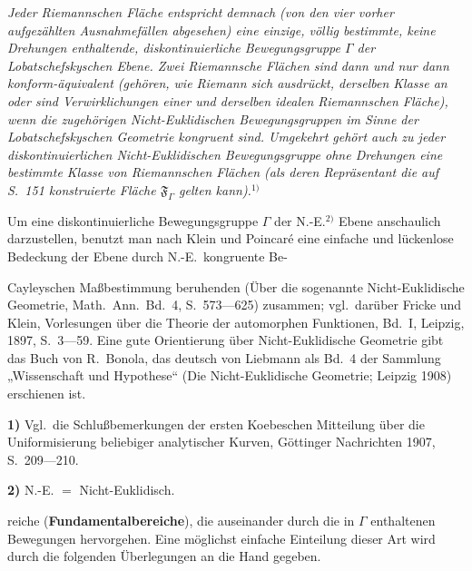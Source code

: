 \documentclass{article}
\begin{document}
\emph{Jeder Riemannschen Fläche entspricht demnach (von den vier vorher aufgezählten Ausnahmefällen abgesehen) eine einzige, völlig bestimmte, keine Drehungen enthaltende, diskontinuierliche Bewegungsgruppe $\varGamma$ der Lobatschefskyschen Ebene. Zwei Riemannsche Flächen sind dann und nur dann konform-äquivalent (gehören, wie Riemann sich ausdrückt, derselben Klasse an oder sind Verwirklichungen einer und derselben idealen Riemannschen Fläche), wenn die zugehörigen Nicht-Euklidischen Bewegungsgruppen im Sinne der Lobatschefskyschen Geometrie kongruent sind. Umgekehrt gehört auch zu jeder diskontinuierlichen Nicht-Euklidischen Bewegungsgruppe ohne Drehungen eine bestimmte Klasse von Riemannschen Flächen (als deren Repräsentant die auf S.~151 konstruierte Fläche $\mathfrak{F}_\varGamma$ gelten kann).}${}^{1)}$

Um eine diskontinuierliche Bewegungsgruppe $\varGamma$ der N.-E.${}^{2)}$ Ebene anschaulich darzustellen, benutzt man nach Klein und Poincaré eine einfache und lückenlose Bedeckung der Ebene durch N.-E.\ kongruente Be-

Cayleyschen Maßbestimmung beruhenden (Über die sogenannte Nicht-Euklidische Geometrie, Math.\ Ann.\ Bd.~4, S.~573---625) zusammen; vgl.\ darüber Fricke und Klein, Vorlesungen über die Theorie der automorphen Funktionen, Bd.~I, Leipzig, 1897, S.~3---59. Eine gute Orientierung über Nicht-Euklidische Geometrie gibt das Buch von R.~Bonola, das deutsch von Liebmann als Bd.~4 der Sammlung „Wissenschaft und Hypothese“ (Die Nicht-Euklidische Geometrie; Leipzig 1908) erschienen ist.

\textbf{1)} Vgl.\ die Schlußbemerkungen der ersten Koebeschen Mitteilung über die Uniformisierung beliebiger analytischer Kurven, Göttinger Nachrichten 1907, S.~209---210.

\textbf{2)} N.-E. $=$ Nicht-Euklidisch.

reiche (\textbf{Fundamentalbereiche}), die auseinander durch die in $\varGamma$ enthaltenen Bewegungen hervorgehen. Eine möglichst einfache Einteilung dieser Art wird durch die folgenden Überlegungen an die Hand gegeben.

\end{document}
